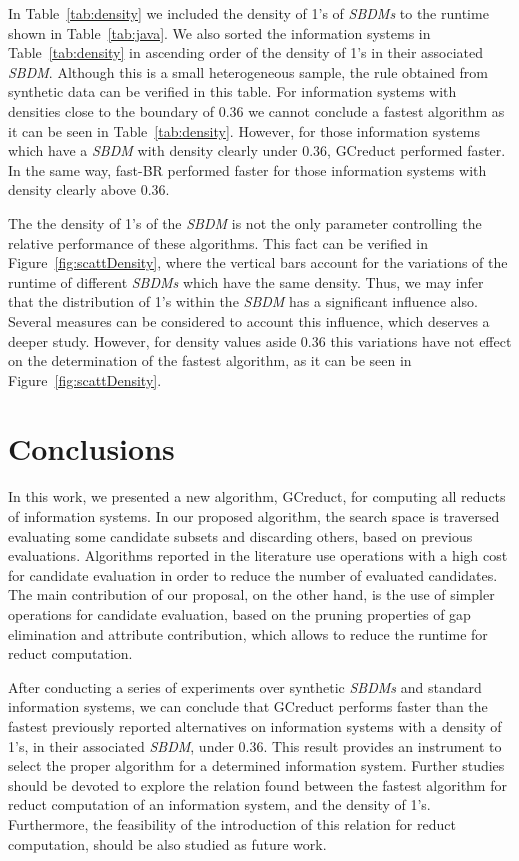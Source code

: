 \documentclass[number,preprint,review,12pt]{elsarticle}
\begin{document}
	In Table~\ref{tab:density} we included the density of 1's of \textit{SBDMs} to the runtime shown in Table~\ref{tab:java}. We also sorted the information systems in Table~\ref{tab:density} in ascending order of the density of 1's in their associated \textit{SBDM}. Although this is a small heterogeneous sample, the rule obtained from synthetic data can be verified in this table. For information systems with densities close to the boundary of 0.36 we cannot conclude a fastest algorithm as it can be seen in Table~\ref{tab:density}. However, for those information systems which have a \textit{SBDM} with density clearly under 0.36, GCreduct performed faster. In the same way, fast-BR performed faster for those information systems with density clearly above 0.36.
	
	The the density of 1's of the \textit{SBDM} is not the only parameter controlling the relative performance of these algorithms. This fact can be verified in Figure~\ref{fig:scattDensity}, where the vertical bars account for the variations of the runtime of different \textit{SBDMs} which have the same density. Thus, we may infer that the distribution of 1's within the \textit{SBDM} has a significant influence also. Several measures can be considered to account this influence, which deserves a deeper study. However, for density values aside 0.36 this variations have not effect on the determination of the fastest algorithm, as it can be seen in Figure~\ref{fig:scattDensity}. 

\section{Conclusions}\label{conclusions}
	In this work, we presented a new algorithm, GCreduct, for computing all reducts of information systems. In our proposed algorithm, the search space is traversed evaluating some candidate subsets and discarding others, based on previous evaluations. Algorithms reported in the literature use operations with a high cost for candidate evaluation in order to reduce the number of evaluated candidates. The main contribution of our proposal, on the other hand, is the use of simpler operations for candidate evaluation, based on the pruning properties of gap elimination and attribute contribution, which allows to reduce the runtime for reduct computation. 
	
	After conducting a series of experiments over synthetic \textit{SBDMs} and standard information systems, we can conclude that GCreduct performs faster than the fastest previously reported alternatives on information systems with a density of 1's, in their associated \textit{SBDM}, under 0.36. This result provides an instrument to select the proper algorithm for a determined information system. Further studies should be devoted to explore the relation found between the fastest algorithm for reduct computation of an information system, and the density of 1's. Furthermore, the feasibility of the introduction of this relation for reduct computation, should be also studied as future work.
\end{document}
